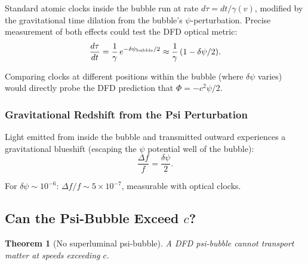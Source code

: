 \documentclass[aps,prd,twocolumn,superscriptaddress,nofootinbib]{revtex4-2}
\newtheorem{theorem}{Theorem}
\newcommand{\ee}[1]{\times 10^{#1}}
\begin{document}
Standard atomic clocks inside the bubble run at rate $d\tau =
dt/\gamma(v)$, modified by the gravitational time dilation from
the bubble's $\psi$-perturbation.  Precise measurement of both
effects could test the DFD optical metric:
\begin{equation}
\frac{d\tau}{dt} = \frac{1}{\gamma}\,e^{-\delta\psi_{\rm bubble}/2}
\approx \frac{1}{\gamma}\,(1 - \delta\psi/2).
\end{equation}

Comparing clocks at different positions within the bubble (where
$\delta\psi$ varies) would directly probe the DFD prediction that
$\Phi = -c^2\psi/2$.

\subsubsection{Gravitational Redshift from the Psi Perturbation}

Light emitted from inside the bubble and transmitted outward experiences
a gravitational blueshift (escaping the $\psi$ potential well of the
bubble):
\begin{equation}
\frac{\Delta f}{f} = \frac{\delta\psi}{2}.
\end{equation}

For $\delta\psi \sim 10^{-6}$: $\Delta f/f \sim 5\ee{-7}$, measurable
with optical clocks.

\subsection{Can the Psi-Bubble Exceed $c$?}\label{sec:no-superluminal}

\begin{theorem}[No superluminal psi-bubble]
A DFD psi-bubble cannot transport matter at speeds exceeding $c$.
\end{theorem}
\end{document}
